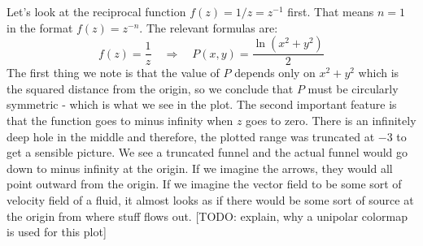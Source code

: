 \documentclass[12pt]{article}
\begin{document}
\medskip
Let's look at the reciprocal function $f(z) = 1/z = z^{-1}$ first. That means $n=1$ in the format $f(z) = z^{-n}$. The relevant formulas are:
\begin{equation}
f(z)   = \frac{1}{z} \quad \Rightarrow \quad
P(x,y) =  \frac{\ln(x^2+y^2)}{2}
\end{equation}
The first thing we note is that the value of $P$ depends only on $x^2 + y^2$ which is the squared distance from the origin, so we conclude that $P$ must be circularly symmetric - which is what we see in the plot. The second important feature is that the function goes to minus infinity when $z$ goes to zero. There is an infinitely deep hole in the middle and therefore, the plotted range was truncated at $-3$ to get a sensible picture. We see a truncated funnel and the actual funnel would go down to minus infinity at the origin. If we imagine the arrows, they would all point outward from the origin. If we imagine the vector field to be some sort of velocity field of a fluid, it almost looks as if there would be some sort of source at the origin from where stuff flows out. [TODO: explain, why a unipolar colormap is used for this plot]
\end{document}

